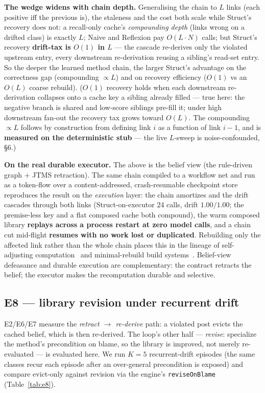 \documentclass[11pt]{article}
\begin{document}
\textbf{The wedge widens with chain depth.} Generalising the chain to $L$ links (each positive iff the previous
is), the staleness and the cost both scale while Struct's recovery does not: a recall-only cache's
\emph{compounding depth} (links wrong on a drifted class) is exactly $L$; Naive and Reflexion pay $O(L{\cdot}N)$
calls; but Struct's recovery \textbf{drift-tax is $O(1)$ in $L$} --- the cascade re-derives only the violated
upstream entry, every downstream re-derivation reusing a sibling's read-set entry. So the deeper the learned method
chain, the larger Struct's advantage on the correctness gap (compounding $\propto L$) and on recovery efficiency
($O(1)$ vs an $O(L)$ coarse rebuild). ($O(1)$ recovery holds when each downstream re-derivation collapses onto a
cache key a sibling already filled --- true here: the negative branch is shared and low-score siblings pre-fill it;
under high downstream fan-out the recovery tax grows toward $O(L)$. The compounding $\propto L$ follows by
construction from defining link $i$ as a function of link $i-1$, and is \textbf{measured on the deterministic stub}
--- the live $L$-sweep is noise-confounded, \S6.)

\textbf{On the real durable executor.} The above is the belief view (the rule-driven graph $+$ JTMS retraction).
The same chain compiled to a workflow net and run as a token-flow over a content-addressed, crash-resumable
checkpoint store reproduces the result on the \emph{execution} layer: the chain amortizes and the drift cascades
through both links (Struct-on-executor 24 calls, drift $1.00/1.00$; the premise-less key and a flat composed cache
both compound), the warm composed library \textbf{replays across a process restart at zero model calls}, and a
chain cut mid-flight \textbf{resumes with no work lost or duplicated}. Rebuilding only the affected link rather than
the whole chain places this in the lineage of self-adjusting computation~\cite{acar2002} and minimal-rebuild build
systems~\cite{mokhov2018}. Belief-view defeasance and durable execution
are complementary: the contract retracts the belief; the executor makes the recomputation durable and selective.

\subsection{E8 --- library revision under recurrent drift}
E2/E6/E7 measure the \emph{retract $\to$ re-derive} path: a violated post evicts the cached belief, which is then
re-derived. The loop's other half --- \emph{revise}: specialize the method's precondition on blame, so the library
is improved, not merely re-evaluated --- is evaluated here. We run $K=5$ recurrent-drift episodes (the same classes
recur each episode after an over-general precondition is exposed) and compare evict-only against revision via the
engine's \texttt{reviseOnBlame} (Table~\ref{tab:e8}).
\end{document}
